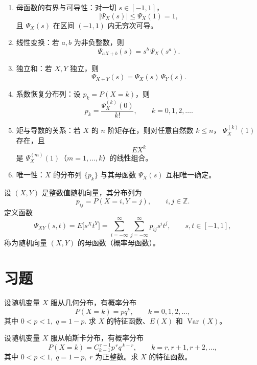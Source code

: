 \begin{theorem}[母函数性质]
    \begin{enumerate}
  \item 母函数的有界与可导性：对一切 $s\in[-1,1]$，
  \[
    |\Psi_X(s)| \le \Psi_X(1) = 1,
  \]
  且 $\Psi_X(s)$ 在区间 $(-1,1)$ 内无穷次可导。

  \item 线性变换：若 $a,b$ 为非负整数，则
  \[
    \Psi_{aX+b}(s) = s^{b}\,\Psi_X(s^{a}).
  \]

  \item 独立和：若 $X,Y$ 独立，则
  \[
    \Psi_{X+Y}(s) = \Psi_X(s)\,\Psi_Y(s).
  \]

  \item 系数恢复分布列：设 $p_k=P(X=k)$，则
  \[
    p_k = \frac{\Psi_X^{(k)}(0)}{k!},\qquad k=0,1,2,\dots .
  \]

  \item 矩与导数的关系：若 $X$ 的 $n$ 阶矩存在，则对任意自然数 $k\le n$，
  $\Psi_X^{(k)}(1)$ 存在，且
  \[
    EX^{k}
  \]
  是 $\Psi_X^{(m)}(1)$（$m=1,\dots,k$）的线性组合。

  \item 唯一性：$X$ 的分布列 $\{p_k\}$ 与其母函数 $\Psi_X(s)$ 互相唯一确定。
\end{enumerate}
\end{theorem}
\begin{definition}[二维整数值随机向量的母函数]
设 $(X,Y)$ 是整数值随机向量，其分布列为
\[
p_{ij}=P(X=i,Y=j),\qquad i,j\in\mathbb{Z}.
\]
定义函数
\[
\Psi_{XY}(s,t)
=E\bigl[s^{X}t^{Y}\bigr]
=\sum_{i=-\infty}^{\infty}\sum_{j=-\infty}^{\infty}
p_{ij}s^{i}t^{j},\qquad s,t\in[-1,1],
\]
称为随机向量 $(X,Y)$ 的母函数（概率母函数）。
\end{definition}
\section{习题}
\begin{homework}[4.1]
设随机变量 $X$ 服从几何分布，有概率分布
\[
P(X=k)=pq^{k},\qquad k=0,1,2,\ldots,
\]
其中 $0<p<1,\; q=1-p$. 求 $X$ 的特征函数、$E(X)$ 和 $\operatorname{Var}(X)$。
\end{homework}

\begin{homework}[4.2]
设随机变量 $X$ 服从帕斯卡分布，有概率分布
\[
P(X=k)=C_{k-1}^{\,r-1} p^{\,r} q^{\,k-r},\qquad k=r,r+1,r+2,\ldots,
\]
其中 $0<p<1,\; q=1-p,\; r$ 为正整数。求 $X$ 的特征函数。
\end{homework}

